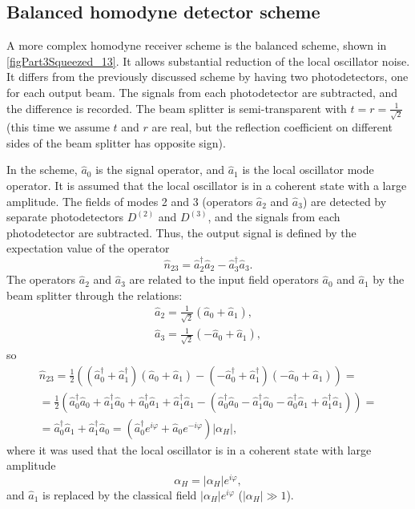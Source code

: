 

\subsection{Balanced homodyne detector scheme}
A more complex homodyne receiver scheme is the balanced scheme,
shown in \autoref{figPart3Squeezed_13}. It allows
substantial reduction of the local oscillator noise. It differs from the previously discussed scheme
by having two photodetectors, one for each
output beam. The signals from each photodetector are subtracted, and
the difference is recorded. The beam splitter is semi-transparent with $t = r =
\frac{1}{\sqrt{2}}$ (this time we assume $t$ and $r$
are real, but the reflection coefficient on different sides of the beam splitter has opposite sign).

In the scheme, $\hat{a}_0$ is the signal operator, and $\hat{a}_1$ is the local oscillator mode operator. It is assumed that the local oscillator is in a coherent
state with a large amplitude. The fields of modes 2 and 3 (operators $\hat{a}_2$
and $\hat{a}_3$) are detected by separate photodetectors $D^{(2)}$ and
$D^{(3)}$, and the signals from each photodetector are subtracted. Thus,
the output signal is defined by the expectation value of the operator
\begin{equation}
\hat{n}_{23} = \hat{a}_2^{\dag}\hat{a}_2 - 
\hat{a}_3^{\dag}\hat{a}_3.
\nonumber
\end{equation}
The operators $\hat{a}_2$ and $\hat{a}_3$ are related to the input field operators $\hat{a}_0$ and $\hat{a}_1$ by the beam splitter through the relations:
\begin{eqnarray}
\hat{a}_2 = \frac{1}{\sqrt{2}} \left(\hat{a}_0 + \hat{a}_1\right),
\nonumber \\
\hat{a}_3 = \frac{1}{\sqrt{2}} \left(- \hat{a}_0 + \hat{a}_1\right),
\nonumber
\end{eqnarray}
so
\begin{eqnarray}
\hat{n}_{23} = \frac{1}{2}
\left(
\left(\hat{a}_0^{\dag} + \hat{a}_1^{\dag}\right)
\left(\hat{a}_0 + \hat{a}_1\right)
-
\left(-\hat{a}_0^{\dag} + \hat{a}_1^{\dag}\right)
\left(-\hat{a}_0 + \hat{a}_1\right)
\right) = 
\nonumber \\
=
\frac{1}{2}
\left(
\hat{a}_0^{\dag}\hat{a}_0 + \hat{a}_1^{\dag}\hat{a}_0
+
\hat{a}_0^{\dag}\hat{a}_1 + \hat{a}_1^{\dag}\hat{a}_1
-
\left(
\hat{a}_0^{\dag}\hat{a}_0 - \hat{a}_1^{\dag}\hat{a}_0
-\hat{a}_0^{\dag}\hat{a}_1 + \hat{a}_1^{\dag}\hat{a}_1
\right)
\right) = 
\nonumber \\
=\hat{a}_0^{\dag}\hat{a}_1 + \hat{a}_1^{\dag}\hat{a}_0 = 
\left(
\hat{a}_0^{\dag}e^{i\varphi} + \hat{a}_0 e^{- i\varphi}
\right)\left|\alpha_H\right|,
\nonumber
\end{eqnarray}
where it was used that the local oscillator is in a
coherent state with large amplitude 
\[
\alpha_H = \left|\alpha_H\right|e^{i\varphi},
\]
and $\hat{a}_1$ is replaced by the classical field
$\left|\alpha_H\right|e^{i\varphi}$ ($\left|\alpha_H\right| \gg 1$).

